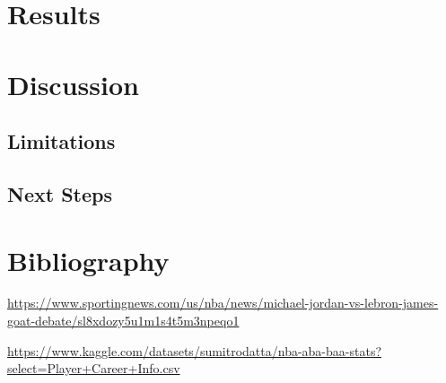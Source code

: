 \documentclass[
  11pt,
]{article}
\begin{document}
\section{Results}\label{results}

\section{Discussion}\label{discussion}

\subsection{Limitations}\label{limitations}

\subsection{Next Steps}\label{next-steps}

\section{Bibliography}\label{bibliography}

\url{https://www.sportingnews.com/us/nba/news/michael-jordan-vs-lebron-james-goat-debate/sl8xdozy5u1m1s4t5m3npeqo1}

\url{https://www.kaggle.com/datasets/sumitrodatta/nba-aba-baa-stats?select=Player+Career+Info.csv}
\end{document}
